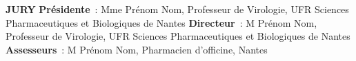 \textbf{JURY}\newline
\textbf{Présidente}~: Mme Prénom Nom, Professeur de Virologie, UFR Sciences Pharmaceutiques et Biologiques de Nantes\newline
\textbf{Directeur}~: M Prénom Nom, Professeur de Virologie, UFR Sciences Pharmaceutiques et Biologiques de Nantes\newline
\textbf{Assesseurs}~: M Prénom Nom, Pharmacien d’officine, Nantes